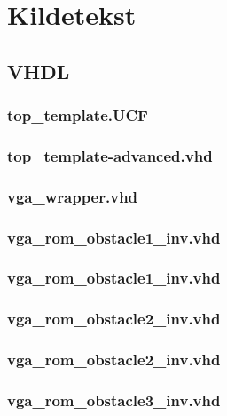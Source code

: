 \section{Kildetekst}
\subsection*{VHDL}
\subsubsection*{top\_template.UCF}


\subsubsection*{top\_template-advanced.vhd}


\subsubsection*{vga\_wrapper.vhd}


\subsubsection*{vga\_rom\_obstacle1\_inv.vhd}


\subsubsection*{vga\_rom\_obstacle1\_inv.vhd}


\subsubsection*{vga\_rom\_obstacle2\_inv.vhd}


\subsubsection*{vga\_rom\_obstacle2\_inv.vhd}


\subsubsection*{vga\_rom\_obstacle3\_inv.vhd}


